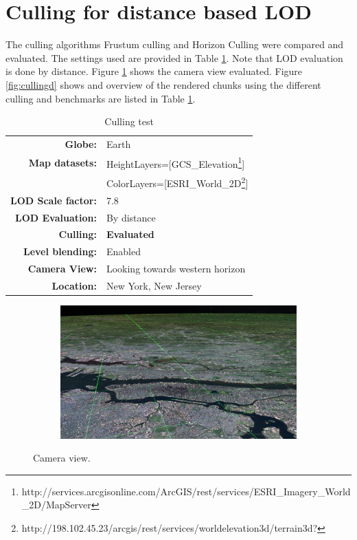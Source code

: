 \clearpage
\section{Culling for distance based LOD}
\FloatBarrier
The culling algorithms Frustum culling and Horizon Culling were compared and evaluated. The settings used are provided in Table \ref{table:cullingd}. Note that LOD evaluation is done by distance. Figure \ref{fig:cullingdcam} shows the camera view evaluated. Figure \ref{fig:cullingd} shows and overview of the rendered chunks using the different culling and benchmarks are listed in Table \ref{table:cullingd}.

\begin{table}[h]
  \centering
  \caption[]{Culling test}
    \label{table:cullingd}
  \begin{tabular}{| r l |}
    \hline
      \textbf{Globe:}             & Earth \\
      \textbf{Map datasets:}      & HeightLayers=[GCS\_Elevation\footnote{http://services.arcgisonline.com/ArcGIS/rest/services/ESRI\_Imagery\_World\_2D/MapServer}] \\
                                  & ColorLayers=[ESRI\_World\_2D\footnote{http://198.102.45.23/arcgis/rest/services/worldelevation3d/terrain3d?}] \\
      \textbf{LOD Scale factor:}  & 7.8 \\
      \textbf{LOD Evaluation:}    & By distance \\
      \textbf{Culling:}           & \textbf{Evaluated} \\
      \textbf{Level blending:}    & Enabled \\
      \textbf{Camera View:}       & Looking towards western horizon\\
      \textbf{Location:}          & New York, New Jersey\\
    \hline
  \end{tabular}
\end{table}

\begin{figure}[h]
    \centering
    \begin{subfigure}[bt]{1.0\textwidth}
        \includegraphics[width=\textwidth]{figures/results/culling/cam_d.png}
    \end{subfigure}
    \caption{Camera view.}
    \label{fig:cullingdcam}
\end{figure}

